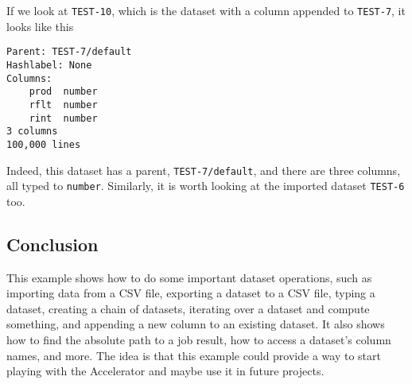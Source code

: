 \documentclass[a4paper]{article}
\begin{document}
If we look at \texttt{TEST-10}, which is the dataset with a column
appended to \texttt{TEST-7}, it looks like this
\begin{snugshade}
\begin{Verbatim}[commandchars=\\\{\}]
Parent: TEST-7/default
Hashlabel: None
Columns:
    prod  number
    rflt  number
    rint  number
3 columns
100,000 lines
\end{Verbatim}
\end{snugshade}
\noindent Indeed, this dataset has a parent, \texttt{TEST-7/default}, and there
are three columns, all typed to \texttt{number}.
Similarly, it is worth looking at the imported dataset \texttt{TEST-6} too.



\subsection*{Conclusion}
This example shows how to do some important dataset operations, such
as importing data from a CSV file, exporting a dataset to a CSV file,
typing a dataset, creating a chain of datasets, iterating over a
dataset and compute something, and appending a new column to an
existing dataset.  It also shows how to find the absolute path to a
job result, how to access a dataset's column names, and more.  The
idea is that this example could provide a way to start playing with
the Accelerator and maybe use it in future projects.
\end{document}
